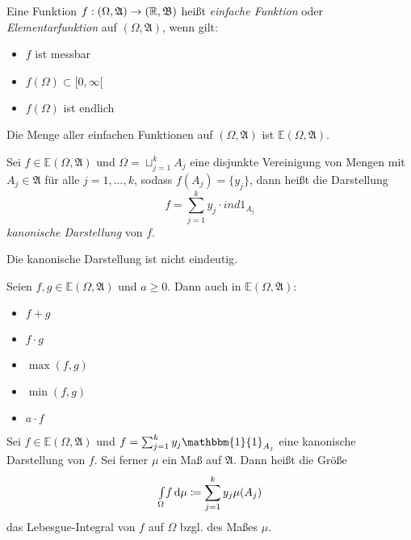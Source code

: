 \documentclass{cheat-sheet}
\newcommand{\Alg}{\mathfrak{A}}
\newcommand{\Bor}{\mathfrak{B}} %
\newcommand{\E}{\mathbb{E}} %
\newcommand{\ind}{\mathbbm{1}} %
\newcommand{\IntOmu}[1]{\Int{\Omega}{}{#1}{\mu}}
\begin{document}
\begin{defn}
  Eine Funktion $f : (\Omega, \Alg) \to (\R, \Bor)$ heißt \emph{einfache Funktion} oder \emph{Elementarfunktion} auf $(\Omega, \Alg)$, wenn gilt:
  \begin{multicols}{3}
    \begin{itemize}
      \item $f$ ist messbar
      \item $f(\Omega) \subset [0, \infty[$
      \item $f(\Omega)$ ist endlich
    \end{itemize}
  \end{multicols}
  Die Menge aller einfachen Funktionen auf $(\Omega, \Alg)$ ist $\E(\Omega, \Alg)$.
\end{defn}

\begin{defn}
  Sei $f \in \E(\Omega, \Alg)$ und $\Omega = \sqcup_{j=1}^k A_j$ eine disjunkte Vereinigung von Mengen mit $A_j \in \Alg$ für alle $j = 1, ..., k$, sodass $f(A_j) = \{ y_j \}$, dann heißt die Darstellung
  \[ f = \sum_{j=1}^k y_j \cdot ind{1}_{A_j} \]
  \emph{kanonische Darstellung} von $f$.
\end{defn}

\begin{bem}
  Die kanonische Darstellung ist nicht eindeutig.
\end{bem}

\begin{satz}
  Seien $f, g \in \E(\Omega, \Alg)$ und $a \geq 0$. Dann auch in $\E(\Omega, \Alg)$:
  \begin{multicols}{5}
    \begin{itemize}
      \item $f + g$
      \item $f \cdot g$
      \item $\max(f, g)$
      \item $\min(f, g)$
      \item $a \cdot f$
    \end{itemize}
  \end{multicols}
\end{satz}

\begin{defn}
  Sei $f \in \E(\Omega, \Alg)$ und $\textstyle f = \sum_{j=1}^k y_j \ind{1}_{A_j}$ eine kanonische Darstellung von $f$. Sei ferner $\mu$ ein Maß auf $\Alg$. Dann heißt die Größe
  \[ \IntOmu{f} \coloneqq \sum_{j=1}^k y_j \mu(A_j) \]
  das Lebesgue-Integral von $f$ auf $\Omega$ bzgl. des Maßes $\mu$.
\end{defn}
\end{document}

